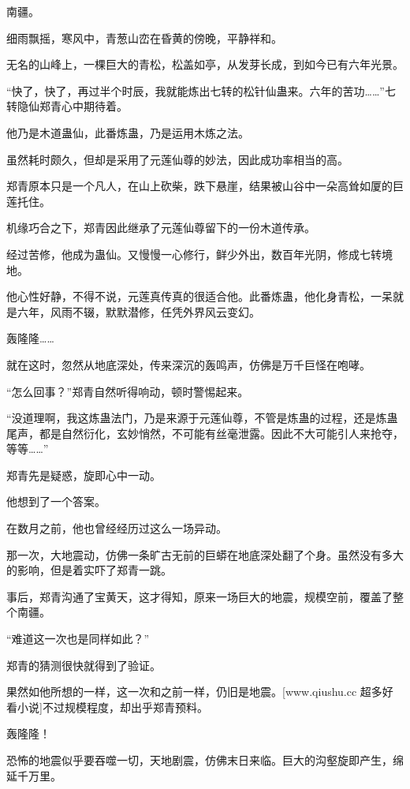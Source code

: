 
\begin{this_body}

南疆。

细雨飘摇，寒风中，青葱山峦在昏黄的傍晚，平静祥和。

无名的山峰上，一棵巨大的青松，松盖如亭，从发芽长成，到如今已有六年光景。

“快了，快了，再过半个时辰，我就能炼出七转的松针仙蛊来。六年的苦功……”七转隐仙郑青心中期待着。

他乃是木道蛊仙，此番炼蛊，乃是运用木炼之法。

虽然耗时颇久，但却是采用了元莲仙尊的妙法，因此成功率相当的高。

郑青原本只是一个凡人，在山上砍柴，跌下悬崖，结果被山谷中一朵高耸如厦的巨莲托住。

机缘巧合之下，郑青因此继承了元莲仙尊留下的一份木道传承。

经过苦修，他成为蛊仙。又慢慢一心修行，鲜少外出，数百年光阴，修成七转境地。

他心性好静，不得不说，元莲真传真的很适合他。此番炼蛊，他化身青松，一呆就是六年，风雨不辍，默默潜修，任凭外界风云变幻。

轰隆隆……

就在这时，忽然从地底深处，传来深沉的轰鸣声，仿佛是万千巨怪在咆哮。

“怎么回事？”郑青自然听得响动，顿时警惕起来。

“没道理啊，我这炼蛊法门，乃是来源于元莲仙尊，不管是炼蛊的过程，还是炼蛊尾声，都是自然衍化，玄妙悄然，不可能有丝毫泄露。因此不大可能引人来抢夺，等等……”

郑青先是疑惑，旋即心中一动。

他想到了一个答案。

在数月之前，他也曾经经历过这么一场异动。

那一次，大地震动，仿佛一条旷古无前的巨蟒在地底深处翻了个身。虽然没有多大的影响，但是着实吓了郑青一跳。

事后，郑青沟通了宝黄天，这才得知，原来一场巨大的地震，规模空前，覆盖了整个南疆。

“难道这一次也是同样如此？”

郑青的猜测很快就得到了验证。

果然如他所想的一样，这一次和之前一样，仍旧是地震。[www.qiushu.cc 超多好看小说]不过规模程度，却出乎郑青预料。

轰隆隆！

恐怖的地震似乎要吞噬一切，天地剧震，仿佛末日来临。巨大的沟壑旋即产生，绵延千万里。


\end{this_body}
